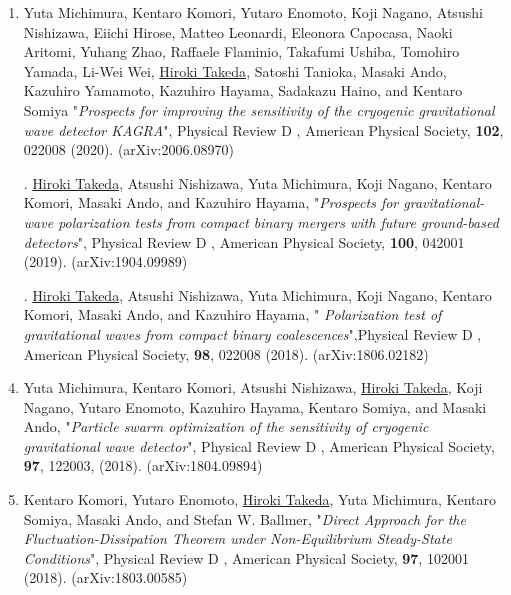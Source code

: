 \documentclass[uplatex, 11pt]{jsarticle}
\newcommand{\ctext}[1]{\ooalign{
\hfil\resizebox{\width}{\height}{#1}\hfil
\crcr
\raise-.1mm\hbox{\Large$\bigcirc$}}}
\begin{document}
\begin{enumerate}
\item Yuta Michimura, Kentaro Komori, Yutaro Enomoto, Koji Nagano, Atsushi Nishizawa, Eiichi Hirose, Matteo Leonardi, Eleonora Capocasa, Naoki Aritomi, Yuhang Zhao, Raffaele Flaminio, Takafumi Ushiba, Tomohiro Yamada, Li-Wei Wei, \uline{Hiroki Takeda}, Satoshi Tanioka, Masaki Ando, Kazuhiro Yamamoto, Kazuhiro Hayama, Sadakazu Haino, and Kentaro Somiya "\emph{Prospects for improving the sensitivity of the cryogenic gravitational wave detector KAGRA}", Physical Review D , American Physical Society, {\bf 102}, 022008 (2020). (arXiv:2006.08970)\\

\item[\ctext{9}.] \uline{Hiroki Takeda}, Atsushi Nishizawa, Yuta Michimura, Koji Nagano, Kentaro Komori, Masaki Ando, and Kazuhiro Hayama, "\emph{Prospects for gravitational-wave polarization tests from compact binary mergers with future ground-based detectors}", Physical Review D , American Physical Society, {\bf 100}, 042001 (2019). (arXiv:1904.09989)\\

\item[\ctext{10}.] \uline{Hiroki Takeda}, Atsushi Nishizawa, Yuta Michimura, Koji Nagano, Kentaro Komori, Masaki Ando, and Kazuhiro Hayama, " \emph{Polarization test of gravitational waves from compact binary coalescences}",Physical Review D , American Physical Society, {\bf 98}, 022008 (2018). (arXiv:1806.02182)\\

\setcounter{enumi}{10}
\item Yuta Michimura, Kentaro Komori, Atsushi Nishizawa, \uline{Hiroki Takeda}, Koji Nagano, Yutaro Enomoto, Kazuhiro Hayama, Kentaro Somiya, and Masaki Ando, "\emph{Particle swarm optimization of the sensitivity of cryogenic gravitational wave detector}", Physical Review D , American Physical Society, {\bf 97}, 122003, (2018). (arXiv:1804.09894)\\

\item Kentaro Komori, Yutaro Enomoto, \uline{Hiroki Takeda}, Yuta Michimura, Kentaro Somiya, Masaki Ando, and Stefan W. Ballmer, "\emph{Direct Approach for the Fluctuation-Dissipation Theorem under Non-Equilibrium Steady-State Conditions}", Physical Review D , American Physical Society, {\bf 97}, 102001 (2018). (arXiv:1803.00585)\\


\end{enumerate}
\end{document}
